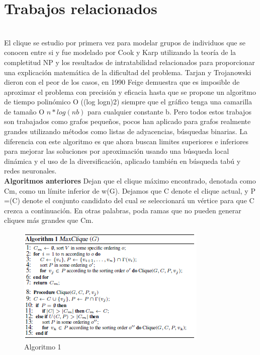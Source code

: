\section{Trabajos relacionados}
\\
El clique se estudio por primera vez para modelar grupos de individuos que se conocen entre si y fue modelado por Cook y Karp utilizando la teoría de la completitud NP y los resultados de intratabilidad relacionados para proporcionar una explicación matemática de la dificultad del problema. Tarjan y Trojanowski dieron con el peor de los casos, en 1990 Feige demuestra que es imposible de aproximar el problema con precisión y eficacia hasta que se propone un algoritmo de tiempo polinómico O ((log logn)2) siempre que el gráfico tenga una camarilla de tamaño O \begin{math}n * log(nb)\end{math} para cualquier constante b. Pero todos estos trabajos son trabajados como grafos pequeños, pocos han aplicado para grafos realmente grandes utilizando métodos como listas de adyacencias, búsquedas binarias. La diferencia con este algoritmo es que ahora buscan limites superiores e inferiores para mejorar las soluciones por aproximación usando una búsqueda local dinámica y el uso de la diversificación, aplicado también en búsqueda tabú y redes neuronales.
\\
\textbf{Algoritmos anteriores}
Dejan que el clique máximo encontrado, denotada como Cm, como un límite inferior de w(G). Dejamos que C denote el clique actual, y P =(C) denote el conjunto candidato del cual se seleccionará un vértice para que C crezca a continuación. En otras palabras, poda ramas que no pueden generar cliques más grandes que Cm.
\\
\begin{figure}[h!]
\centering
\includegraphics[scale=1.5]{img/imagen1.png}
\caption{Algoritmo 1}
\label{Comandos}
\end{figure}
\\
